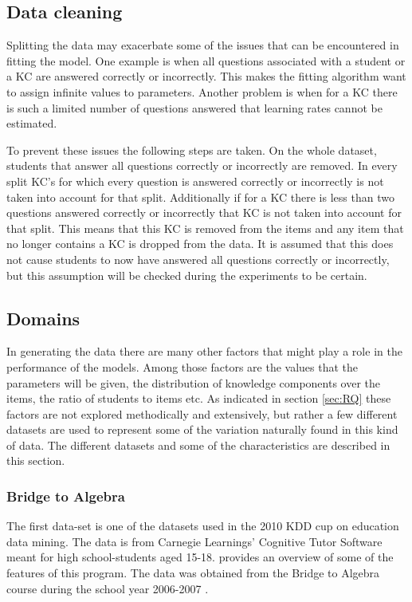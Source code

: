 \documentclass{scrartcl}
\begin{document}
\subsection{Data cleaning}
\label{sec:cleaning}
Splitting the data may exacerbate some of the issues that can be encountered in fitting the model. One example is when all questions associated with a student or a KC are answered correctly or incorrectly. This makes the fitting algorithm want to assign infinite values to parameters. Another problem is when for a KC there is such a limited number of questions answered that learning rates cannot be estimated.

To prevent these issues the following steps are taken. On the whole dataset, students that answer all questions correctly or incorrectly are removed. In every split KC's for which every question is answered correctly or incorrectly is not taken into account for that split. Additionally if for a KC there is less than two questions answered correctly or incorrectly that KC is not taken into account for that split. This means that this KC is removed from the items and any item that no longer contains a KC is dropped from the data. It is assumed that this does not cause students to now have answered all questions correctly or incorrectly, but this assumption will be checked during the experiments to be certain.


\subsection{Domains}
\label{sec:domain}
In generating the data there are many other factors that might play a role in the performance of the models. Among those factors are the values that the parameters will be given, the distribution of knowledge components over the items, the ratio of students to items etc. As indicated in section \ref{sec:RQ} these factors are not explored methodically and extensively, but rather a few different datasets are used to represent some of the variation naturally found in this kind of data. The different datasets and some of the characteristics are described in this section.

\subsubsection{Bridge to Algebra}
The first data-set is one of the datasets used in the 2010 KDD cup on education data mining. The data is from Carnegie Learnings' Cognitive Tutor Software meant for high school-students aged 15-18. \cite{ct} provides an overview of some of the features of this program. The data was obtained from the Bridge to Algebra course during the school year 2006-2007 \cite{bridge}. 
\end{document}
